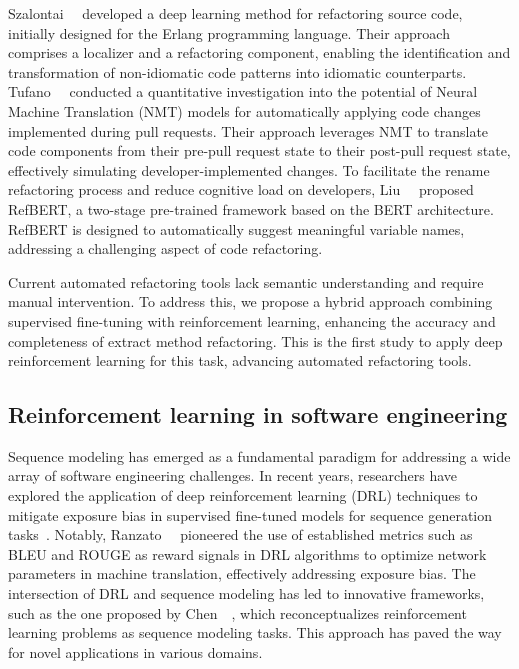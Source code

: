 Szalontai~\etal{}~\cite{szalontai2023deep} developed a deep learning method for refactoring source code, initially designed for the Erlang programming language. Their approach comprises a localizer and a refactoring component, enabling the identification and transformation of non-idiomatic code patterns into idiomatic counterparts. Tufano~\etal{}~\cite{tufano2019learning} conducted a quantitative investigation into the potential of Neural Machine Translation (NMT) models for automatically applying code changes implemented during pull requests. Their approach leverages NMT to translate code components from their pre-pull request state to their post-pull request state, effectively simulating developer-implemented changes. To facilitate the rename refactoring process and reduce cognitive load on developers, Liu~\etal{}~\cite{liu2023refbert} proposed RefBERT, a two-stage pre-trained framework based on the BERT architecture. RefBERT is designed to automatically suggest meaningful variable names, addressing a challenging aspect of code refactoring.


Current automated refactoring tools lack semantic understanding and require manual intervention. To address this, we propose a hybrid approach combining supervised fine-tuning with reinforcement learning, enhancing the accuracy and completeness of extract method refactoring. This is the first study to apply deep reinforcement learning for this task, advancing automated refactoring tools.

\subsection{Reinforcement learning in software engineering}

Sequence modeling has emerged as a fundamental paradigm for addressing a wide array of software engineering challenges. In recent years, researchers have explored the application of deep reinforcement learning (DRL) techniques to mitigate exposure bias in supervised fine-tuned models for sequence generation tasks~\cite{ranzato2016sequenceleveltrainingrecurrent, keneshloo2019deepreinforcementlearningsequence}. Notably, Ranzato~\etal{}~\cite{ranzato2016sequenceleveltrainingrecurrent} pioneered the use of established metrics such as BLEU and ROUGE as reward signals in DRL algorithms to optimize network parameters in machine translation, effectively addressing exposure bias. The intersection of DRL and sequence modeling has led to innovative frameworks, such as the one proposed by Chen~\etal{}~\cite{chen2021decisiontransformerreinforcementlearning}, which reconceptualizes reinforcement learning problems as sequence modeling tasks. This approach has paved the way for novel applications in various domains.

